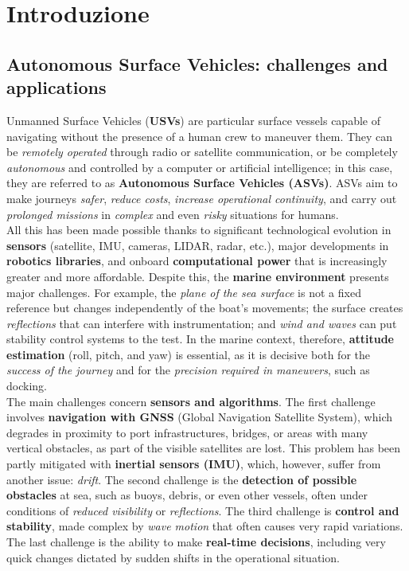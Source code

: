\chapter{Introduzione} %
\thispagestyle{empty}
\section{Autonomous Surface Vehicles: challenges and applications}
Unmanned Surface Vehicles (\textbf{USVs}) are particular surface vessels capable of navigating without the presence of a human crew to maneuver them. They can be \textit{remotely operated} through radio or satellite communication, or be completely \textit{autonomous} and controlled by a computer or artificial intelligence; in this case, they are referred to as \textbf{Autonomous Surface Vehicles (ASVs)}. ASVs aim to make journeys \textit{safer}, \textit{reduce costs}, \textit{increase operational continuity}, and carry out \textit{prolonged missions} in \textit{complex} and even \textit{risky} situations for humans.\\

All this has been made possible thanks to significant technological evolution in \textbf{sensors} (satellite, IMU, cameras, LIDAR, radar, etc.), major developments in \textbf{robotics libraries}, and onboard \textbf{computational power} that is increasingly greater and more affordable. Despite this, the \textbf{marine environment} presents major challenges. For example, the \textit{plane of the sea surface} is not a fixed reference but changes independently of the boat’s movements; the surface creates \textit{reflections} that can interfere with instrumentation; and \textit{wind and waves} can put stability control systems to the test. In the marine context, therefore, \textbf{attitude estimation} (roll, pitch, and yaw) is essential, as it is decisive both for the \textit{success of the journey} and for the \textit{precision required in maneuvers}, such as docking.\\

The main challenges concern \textbf{sensors and algorithms}. The first challenge involves \textbf{navigation with GNSS} (Global Navigation Satellite System), which degrades in proximity to port infrastructures, bridges, or areas with many vertical obstacles, as part of the visible satellites are lost. This problem has been partly mitigated with \textbf{inertial sensors (IMU)}, which, however, suffer from another issue: \textit{drift}. The second challenge is the \textbf{detection of possible obstacles} at sea, such as buoys, debris, or even other vessels, often under conditions of \textit{reduced visibility} or \textit{reflections}. The third challenge is \textbf{control and stability}, made complex by \textit{wave motion} that often causes very rapid variations. The last challenge is the ability to make \textbf{real-time decisions}, including very quick changes dictated by sudden shifts in the operational situation.\\

